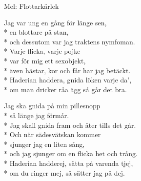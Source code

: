 \begin{SongText}[Blottarkärlek]
    \begin{SongInfo}
        Mel: Flottarkärlek
    \end{SongInfo}
    \begin{SongVerse}
        Jag var ung en gång för länge sen,\\*%
        en blottare på stan,\\*%
        och dessutom var jag traktens nymfoman.\\*%
        Varje flicka, varje pojke\\*%
        var för mig ett sexobjekt,\\*%
        även hästar, kor och får har jag betäckt.\\*%
        Haderian haddera, gnida löken varje da',\\*%
        om man dricker råa ägg så går det bra.
    \end{SongVerse}
    \begin{SongVerse}
        Jag ska gnida på min pillesnopp\\*%
        så länge jag förmår.\\*%
        Jag skall gnida fram och åter tills det går.\\*%
        Och när sädesvätskan kommer\\*%
        sjunger jag en liten sång,\\*%
        och jag sjunger om en flicka het och trång.\\*%
        Haderian hadderej, sätta på varenda tjej,\\*%
        om du ringer mej, så sätter jag på dej.
    \end{SongVerse}
\end{SongText}
